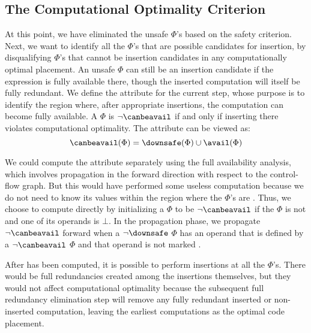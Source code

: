 \subsection{The Computational Optimality Criterion}

At this point, we have eliminated the unsafe $\Phi$'s based on the safety criterion. 
Next, we want to identify all the $\Phi$'s that are possible candidates for insertion, by disqualifying $\Phi$'s that cannot be insertion candidates in any computationally optimal placement. 
An unsafe $\Phi$ can still be an insertion candidate if the expression is fully available there, though the inserted computation will itself be fully redundant. 
We define the \canbeavail{} attribute for the current step, whose purpose is to identify the region where, after appropriate insertions, the computation can become fully available. 
A $\Phi$ is $\neg \canbeavail$ if and only if inserting there violates computational optimality. 
The \canbeavail attribute can be viewed as:
$$ \canbeavail(\Phi) = \downsafe(\Phi) \cup \avail(\Phi) $$

We could compute the \avail{} attribute separately using the full availability analysis, which involves propagation in the forward direction with respect to the control-flow graph. 
But this would have performed some useless computation because we do not need to know its values within the region where the $\Phi$'s are \downsafe. 
Thus, we choose to compute \canbeavail directly by initializing a $\Phi$ to be $\neg \canbeavail$ if the $\Phi$ is not \downsafe and one of its operands is $\bot$. 
In the propagation phase, we propagate $\neg \canbeavail$ forward when a $\neg \downsafe$ $\Phi$ has an operand that is defined by a $\neg \canbeavail$ $\Phi$ and that operand is not marked \hasrealuse.

After \canbeavail has been computed, it is possible to perform insertions at all the \canbeavail $\Phi$'s. 
There would be full redundancies created among the insertions themselves, but they would not affect computational optimality because the subsequent full redundancy elimination step will remove any fully redundant inserted or non-inserted computation, leaving the earliest computations as the optimal code placement.

